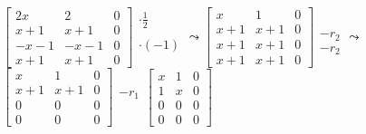 \documentclass[a4paper,12pt]{article}
\begin{document}
$
\left[\begin{array}{cc|c}
    2x & 2 & 0\\
    x+1 & x+1 & 0\\
    -x-1 & -x-1 & 0\\
    x+1 & x+1 & 0
\end{array}\right]
\begin{array}{ccc}
    \cdot \frac{1}{2}\\
    \\
    \cdot (-1)\\
    \\
\end{array}
\leadsto
\left[\begin{array}{cc|c}
    x & 1 & 0\\
    x+1 & x+1 & 0\\
    x+1 & x+1 & 0\\
    x+1 & x+1 & 0
\end{array}\right]
\begin{array}{ccc}
    \\
    \\
    -r_2\\
    -r_2
\end{array}
\leadsto
$\\
$
\left[\begin{array}{cc|c}
    x & 1 & 0\\
    x+1 & x+1 & 0\\
    0 & 0 & 0\\
    0 & 0 & 0
\end{array}\right]
\begin{array}{ccc}
    \\
    -r_1\\
    \\
    
\end{array}
\left[\begin{array}{cc|c}
    x & 1 & 0\\
    1 & x & 0\\
    0 & 0 & 0\\
    0 & 0 & 0
\end{array}\right]
\begin{array}{ccc}
    \\
    \\
    \\
    
\end{array}
$\\
\end{document}
